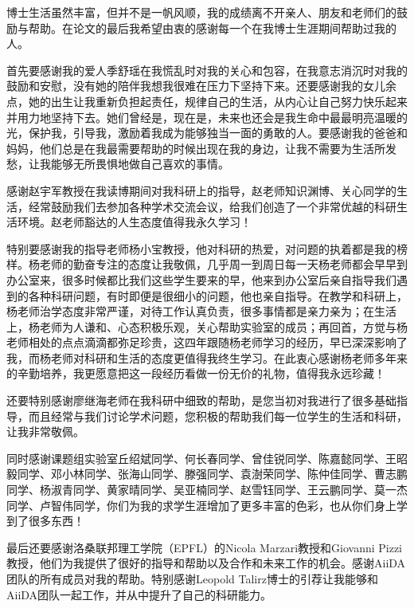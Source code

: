 \documentclass[phd,nobackinfo]{scutthesis}
\begin{document}
\begin{acknowledgement}
  博士生活虽然丰富，但并不是一帆风顺，我的成绩离不开亲人、朋友和老师们的鼓励与帮助。在论文的最后我希望由衷的感谢每一个在我博士生涯期间帮助过我的人。

  首先要感谢我的爱人季舒瑶在我慌乱时对我的关心和包容，在我意志消沉时对我的鼓励和安慰，没有她的陪伴我想我很难在压力下坚持下来。还要感谢我的女儿余点，她的出生让我重新负担起责任，规律自己的生活，从内心让自己努力快乐起来并用力地坚持下去。她们曾经是，现在是，未来也还会是我生命中最最明亮温暖的光，保护我，引导我，激励着我成为能够独当一面的勇敢的人。要感谢我的爸爸和妈妈，他们总是在我最需要帮助的时候出现在我的身边，让我不需要为生活所发愁，让我能够无所畏惧地做自己喜欢的事情。

  感谢赵宇军教授在我读博期间对我科研上的指导，赵老师知识渊博、关心同学的生活，经常鼓励我们去参加各种学术交流会议，给我们创造了一个非常优越的科研生活环境。赵老师豁达的人生态度值得我永久学习！

  特别要感谢我的指导老师杨小宝教授，他对科研的热爱，对问题的执着都是我的榜样。杨老师的勤奋专注的态度让我敬佩，几乎周一到周日每一天杨老师都会早早到办公室来，很多时候都比我们这些学生要来的早，他来到办公室后亲自指导我们遇到的各种科研问题，有时即便是很细小的问题，他也亲自指导。在教学和科研上，杨老师治学态度非常严谨，对待工作认真负责，很多事情都是亲力亲为；在生活上，杨老师为人谦和、心态积极乐观，关心帮助实验室的成员；再回首，方觉与杨老师相处的点点滴滴都弥足珍贵，这四年跟随杨老师学习的经历，早已深深影响了我，而杨老师对科研和生活的态度更值得我终生学习。在此衷心感谢杨老师多年来的辛勤培养，我更愿意把这一段经历看做一份无价的礼物，值得我永远珍藏！

  还要特别感谢廖继海老师在我科研中细致的帮助，是您当初对我进行了很多基础指导，而且经常与我们讨论学术问题，您积极的帮助我们每一位学生的生活和科研，让我非常敬佩。

  同时感谢课题组实验室丘绍斌同学、何长春同学、曾佳锐同学、陈嘉懿同学、王昭毅同学、邓小林同学、张海山同学、滕强同学、袁澍荣同学、陈仲佳同学、曹志鹏同学、杨淑青同学、黄家晴同学、吴亚楠同学、赵雪钰同学、王云鹏同学、莫一杰同学、卢智伟同学，你们为我的求学生涯增加了更多丰富的色彩，也从你们身上学到了很多东西！

  最后还要感谢洛桑联邦理工学院（EPFL）的Nicola Marzari教授和Giovanni Pizzi教授，他们为我提供了很好的指导和帮助以及合作和未来工作的机会。感谢AiiDA团队的所有成员对我的帮助。特别感谢Leopold Talirz博士的引荐让我能够和AiiDA团队一起工作，并从中提升了自己的科研能力。

\end{acknowledgement}
\end{document}
